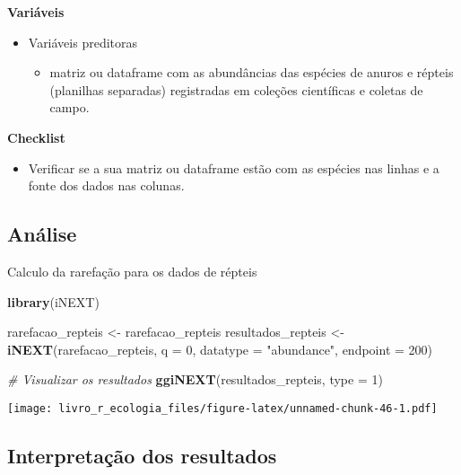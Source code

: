 \documentclass[
]{book}
\newenvironment{Shaded}{\begin{snugshade}}{\end{snugshade}}
\newcommand{\CommentTok}[1]{\textcolor[rgb]{0.56,0.35,0.01}{\textit{#1}}}
\newcommand{\DataTypeTok}[1]{\textcolor[rgb]{0.13,0.29,0.53}{#1}}
\newcommand{\DecValTok}[1]{\textcolor[rgb]{0.00,0.00,0.81}{#1}}
\newcommand{\KeywordTok}[1]{\textcolor[rgb]{0.13,0.29,0.53}{\textbf{#1}}}
\newcommand{\NormalTok}[1]{#1}
\newcommand{\StringTok}[1]{\textcolor[rgb]{0.31,0.60,0.02}{#1}}
\providecommand{\tightlist}{%
  \setlength{\itemsep}{0pt}\setlength{\parskip}{0pt}}
\begin{document}
\textbf{Variáveis}

\begin{itemize}
\tightlist
\item
  Variáveis preditoras

  \begin{itemize}
  \tightlist
  \item
    matriz ou dataframe com as abundâncias das espécies de anuros e répteis (planilhas separadas) registradas em coleções científicas e coletas de campo.
  \end{itemize}
\end{itemize}

\textbf{Checklist}

\begin{itemize}
\tightlist
\item
  Verificar se a sua matriz ou dataframe estão com as espécies nas linhas e a fonte dos dados nas colunas.
\end{itemize}

\hypertarget{anuxe1lise-1}{%
\subsection{Análise}\label{anuxe1lise-1}}

Calculo da rarefação para os dados de répteis

\begin{Shaded}
\begin{Highlighting}[]
\KeywordTok{library}\NormalTok{(iNEXT)}

\NormalTok{rarefacao_repteis <-}\StringTok{ }\NormalTok{rarefacao_repteis}
\NormalTok{resultados_repteis <-}\StringTok{ }\KeywordTok{iNEXT}\NormalTok{(rarefacao_repteis, }\DataTypeTok{q =} \DecValTok{0}\NormalTok{, }\DataTypeTok{datatype =} \StringTok{"abundance"}\NormalTok{, }\DataTypeTok{endpoint =} \DecValTok{200}\NormalTok{)}

\CommentTok{# Visualizar os resultados }
\KeywordTok{ggiNEXT}\NormalTok{(resultados_repteis, }\DataTypeTok{type =} \DecValTok{1}\NormalTok{)}
\end{Highlighting}
\end{Shaded}

\texttt{[image: livro\_r\_ecologia\_files/figure-latex/unnamed-chunk-46-1.pdf]}

\hypertarget{interpretauxe7uxe3o-dos-resultados-1}{%
\subsection{Interpretação dos resultados}\label{interpretauxe7uxe3o-dos-resultados-1}}
\end{document}

